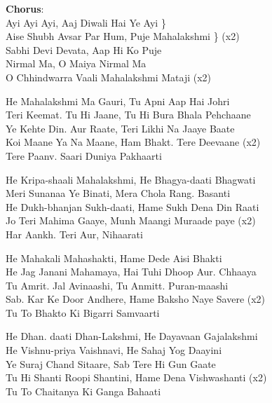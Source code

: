
{\bf Chorus}: \\
Ayi Ayi Ayi, Aaj Diwali Hai Ye Ayi \} \\
Aise Shubh Avsar Par Hum, Puje Mahalakshmi \} (x2) \\
Sabhi Devi Devata, Aap Hi Ko Puje \\
Nirmal Ma, O Maiya Nirmal Ma \\
O Chhindwarra Vaali Mahalakshmi Mataji (x2) \linebreak[2]

He Mahalakshmi Ma Gauri, Tu Apni Aap Hai Johri \\
Teri Keemat. Tu Hi Jaane, Tu Hi Bura Bhala Pehchaane \\
Ye Kehte Din. Aur Raate, Teri Likhi Na Jaaye Baate \\
Koi Maane Ya Na Maane, Ham Bhakt. Tere Deevaane (x2) \\
Tere Paanv. Saari Duniya Pakhaarti \linebreak[2]

He Kripa-shaali Mahalakshmi, He Bhagya-daati Bhagwati \\
Meri Sunanaa Ye Binati, Mera Chola Rang. Basanti \\
He Dukh-bhanjan Sukh-daati, Hame Sukh Dena Din Raati \\
Jo Teri Mahima Gaaye, Munh Maangi Muraade paye (x2) \\
Har Aankh. Teri Aur, Nihaarati \linebreak[2]

He Mahakali Mahashakti, Hame Dede Aisi Bhakti \\
He Jag Janani Mahamaya, Hai Tuhi Dhoop Aur. Chhaaya \\
Tu Amrit. Jal Avinaashi, Tu Anmitt. Puran-maashi \\
Sab. Kar Ke Door Andhere, Hame Baksho Naye Savere (x2) \\
Tu To Bhakto Ki Bigarri Samvaarti \linebreak[2]

He Dhan. daati Dhan-Lakshmi, He Dayavaan Gajalakshmi \\
He Vishnu-priya Vaishnavi, He Sahaj Yog Daayini \\
Ye Suraj Chand Sitaare, Sab Tere Hi Gun Gaate \\
Tu Hi Shanti Roopi Shantini, Hame Dena Vishwashanti (x2) \\
Tu To Chaitanya Ki Ganga Bahaati \\

\newpage